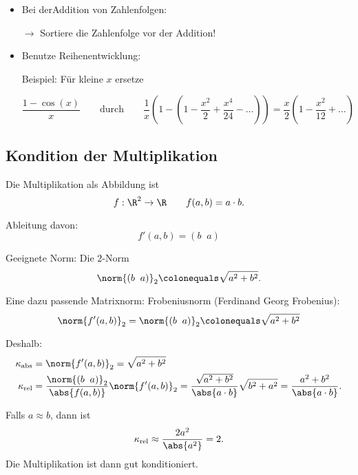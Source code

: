 \begin{itemize}
  \item Bei derAddition von Zahlenfolgen:

  $\rightarrow$ Sortiere die Zahlenfolge vor der Addition!

  \item Benutze Reihenentwicklung:

  Beispiel: Für kleine $x$ ersetze

 \begin{equation*}
 \frac{1-\cos(x)}{x}
 \qquad \text{durch} \qquad
  \frac{1}{x}\left(1-(1-\frac{x^2}{2} + \frac{x^4}{24} -\dots)\right)
  = \frac{x}{2}\left(1 - \frac{x^2}{12} + \dots\right)
\end{equation*}
\end{itemize}


\subsection{Kondition der Multiplikation}

Die Multiplikation als Abbildung ist
\begin{equation*}
 f : \R^2 \to \R
 \qquad
 f(a, b) = a\cdot b.
\end{equation*}


Ableitung davon:
\begin{equation*}
 f'(a, b) = (b \;\; a)
\end{equation*}

Geeignete Norm: Die $2$-Norm
\begin{equation*}
\norm{(b \;\; a)}_2 \colonequals \sqrt{a^2 + b^2}.
\end{equation*}

Eine dazu passende Matrixnorm: Frobeniusnorm (Ferdinand Georg Frobenius):
\begin{equation*}
\norm{f'(a, b)}_2 = \norm{(b \;\; a)}_2 \colonequals \sqrt{a^2 + b^2}
\end{equation*}

Deshalb:
\begin{align*}
 \kappa_\text{abs}
 & =
 \norm{f'(a, b)}_2 = \sqrt{a^2 + b^2}\\
 \kappa_\text{rel}
 & =
 \frac{\norm{(b \;\; a)}_2}{\abs{f(a, b)}}\norm{f'(a, b)}_2 = \frac{\sqrt{a^2 + b^2}}{\abs{a\cdot b}}\sqrt{b^2 + a^2} = \frac{a^2 + b^2}{\abs{a\cdot b}}.
\end{align*}

Falls $a\approx b$, dann ist
\begin{equation*}
\kappa_\text{rel}\approx \frac{2a^2}{\abs{a^2}} = 2.
\end{equation*}
Die Multiplikation ist dann gut konditioniert.


